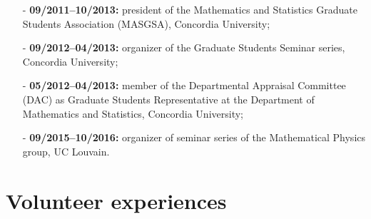 \documentclass[margin]{res}
\begin{document}
\begin{resume}
\begin{itemize}\itemsep -2pt
%
%
\item[-]  {\bf 09/2011--10/2013:} president of the Mathematics and Statistics Graduate Students Association (MASGSA), Concordia University;
\item[-] {\bf 09/2012--04/2013:} organizer of the Graduate Students Seminar series, Concordia University;
\item[-] {\bf 05/2012--04/2013:} member of the Departmental Appraisal Committee (DAC) as Graduate Students Representative at the Department of Mathematics and Statistics, Concordia University;
\item[-] {\bf 09/2015--10/2016:} organizer of seminar series of the Mathematical Physics group, UC Louvain. \\
\end{itemize}


 \section{Volunteer experiences}


\end{resume}
\end{document}
